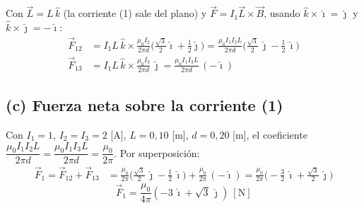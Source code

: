 \documentclass[12pt,letterpaper]{article}
\begin{document}
\medskip

\noindent Con $\vec{L}=L\,\hat{k}$ (la corriente (1) sale del plano) y $\vec{F}=I_1\vec{L}\times\vec{B}$,
usando $\hat{k}\times\hat{\imath}=\hat{\jmath}$ y $\hat{k}\times\hat{\jmath}=-\hat{\imath}$:
\begin{align*}
    \vec{F}_{12} &= I_1 L\,\hat{k}\times\frac{\mu_0 I_2}{2\pi d}
        \Big(\tfrac{\sqrt{3}}{2}\hat{\imath}+\tfrac12\hat{\jmath}\Big)
        = \frac{\mu_0 I_1 I_2 L}{2\pi d}\Big(\tfrac{\sqrt{3}}{2}\,\hat{\jmath}-\tfrac12\,\hat{\imath}\Big)\\
    \vec{F}_{13} &= I_1 L\,\hat{k}\times\frac{\mu_0 I_3}{2\pi d}\,\hat{\jmath}
        = \frac{\mu_0 I_1 I_3 L}{2\pi d}\,(-\hat{\imath})
\end{align*}

\subsection*{(c) Fuerza neta sobre la corriente (1)}

Con $I_1=1$, $I_2=I_3=2$ [A], $L=0{,}10$ [m], $d=0{,}20$ [m], el coeficiente
$\dfrac{\mu_0 I_1 I_2 L}{2\pi d}=\dfrac{\mu_0 I_1 I_3 L}{2\pi d}=\dfrac{\mu_0}{2\pi}$. Por
superposici\'on:
\begin{align*}
    \vec{F}_1 = \vec{F}_{12}+\vec{F}_{13}
      &= \frac{\mu_0}{2\pi}\Big(\tfrac{\sqrt{3}}{2}\,\hat{\jmath}-\tfrac12\,\hat{\imath}\Big)
         + \frac{\mu_0}{2\pi}\,(-\hat{\imath})
       = \frac{\mu_0}{2\pi}\Big(-\tfrac{3}{2}\,\hat{\imath}+\tfrac{\sqrt{3}}{2}\,\hat{\jmath}\Big)
\end{align*}
\[
    \boxed{\vec{F}_1 = \frac{\mu_0}{4\pi}\left(-3\,\hat{\imath}+\sqrt{3}\,\hat{\jmath}\right)\ [\text{N}]}
\]
\end{document}
